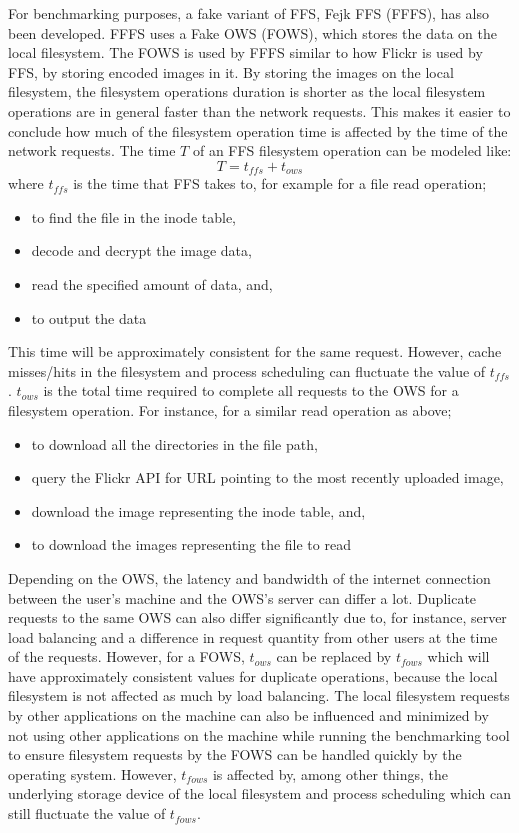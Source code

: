 For benchmarking purposes, a fake variant of FFS, Fejk FFS (\gls{FFFS}), has also been developed. FFFS uses a Fake OWS (\gls{FOWS}), which stores the data on the local filesystem. The FOWS is used by FFFS similar to how Flickr is used by FFS, by storing encoded images in it. By storing the images on the local filesystem, the filesystem operations duration is shorter as the local filesystem operations are in general faster than the network requests. This makes it easier to conclude how much of the filesystem operation time is affected by the time of the network requests. The time $T$ of an FFS filesystem operation can be modeled like:
$$
	T = t_{ffs} + t_{ows}
$$
where $t_{ffs}$ is the time that FFS takes to, for example for a file read operation;
\begin{itemize}
	\item to find the file in the inode table,
	\item decode and decrypt the image data,
	\item read the specified amount of data, and,
	\item to output the data
\end{itemize}
This time will be approximately consistent for the same request. However, cache misses/hits in the filesystem and process scheduling can fluctuate the value of $t_{ffs}$. $t_{ows}$ is the total time required to complete all requests to the OWS for a filesystem operation. For instance, for a similar read operation as above;
\begin{itemize}
	\item to download all the directories in the file path,
	\item query the Flickr API for URL pointing to the most recently uploaded image,
	\item download the image representing the inode table, and,
	\item to download the images representing the file to read
\end{itemize}
Depending on the OWS, the latency and bandwidth of the internet connection between the user's machine and the OWS's server can differ a lot. Duplicate requests to the same OWS can also differ significantly due to, for instance, server load balancing and a difference in request quantity from other users at the time of the requests. However, for a FOWS, $t_{ows}$ can be replaced by $t_{fows}$ which will have approximately consistent values for duplicate operations, because the local filesystem is not affected as much by load balancing. The local filesystem requests by other applications on the machine can also be influenced and minimized by not using other applications on the machine while running the benchmarking tool to ensure filesystem requests by the FOWS can be handled quickly by the operating system. However, $t_{fows}$ is affected by, among other things, the underlying storage device of the local filesystem and process scheduling which can still fluctuate the value of $t_{fows}$.

